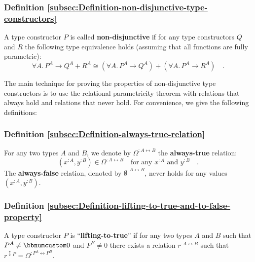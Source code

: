 \subsubsection{Definition \label{subsec:Definition-non-disjunctive-type-constructors}\ref{subsec:Definition-non-disjunctive-type-constructors}}

A type constructor $P$ is called \textbf{non-disjunctive}
if for any type constructors $Q$ and $R$ the following type equivalence
holds (assuming that all functions are fully parametric):
\begin{equation}
\forall A.\,P^{A}\rightarrow Q^{A}+R^{A}\cong(\forall A.\,P^{A}\rightarrow Q^{A})+(\forall A.\,P^{A}\rightarrow R^{A})\quad.\label{eq:non-disjunctive-type-equivalence}
\end{equation}

The main technique for proving the properties of non-disjunctive type
constructors is to use the relational parametricity theorem with relations
that always hold and relations that never hold. For convenience, we
give the following definitions:

\subsubsection{Definition \label{subsec:Definition-always-true-relation}\ref{subsec:Definition-always-true-relation}}

For any two types $A$ and $B$, we denote by $\Omega^{:A\leftrightarrow B}$
the \textbf{always-true} relation:
\[
(x^{:A},y^{:B})\in\Omega^{:A\leftrightarrow B}\quad\text{for any }x^{:A}\text{ and }y^{:B}\quad.
\]
The \textbf{always-false} relation,
denoted by $\emptyset^{:A\leftrightarrow B}$, never holds for any
values $(x^{:A},y^{:B})$.

\subsubsection{Definition \label{subsec:Definition-lifting-to-true-and-to-false-property}\ref{subsec:Definition-lifting-to-true-and-to-false-property}}

A type constructor $P$ is \textsf{``}\textbf{lifting-to-true}\textsf{''}
if for any two types $A$ and $B$ such that $P^{A}\neq\bbnum 0$
and $P^{B}\neq0$ there exists a relation $r^{:A\leftrightarrow B}$
such that $r^{\updownarrow P}=\Omega^{:P^{A}\leftrightarrow P^{B}}$.

